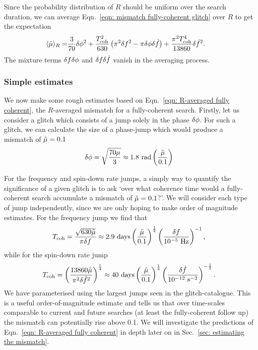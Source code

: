 \documentclass[../full_thesis/full_thesis.tex]{subfiles}
\begin{document}
Since the probability distribution of
$R$ should be uniform over the search duration, we can average Eqn.~\eqref{eqn:
mismatch fully-coherent glitch} over $R$ to get the expectation
\begin{align}
\langle \tilde{\mu} \rangle_{R} = &
\frac{3}{70}\delta\phi^{2}
+ \frac{T_{\mathrm{coh}}^{2}}{630}\left(\pi^{2}\delta f^{2}
- \pi\delta\phi\delta\dot{f}\right)
+ \frac{\pi^{2}T_{\mathrm{coh}}^{4}}{13860} \delta\dot{f}^{2}.
\label{eqn: R-averaged fully coherent}
\end{align}
The mixture terms $\delta f\delta\phi$ and
$\delta f\delta\dot{f}$ vanish in the averaging process.

\subsubsection{Simple estimates}

We now make some rough estimates based on Eqn.~\eqref{eqn: R-averaged
fully coherent}, the $R$-averaged mismatch for a fully-coherent search.
Firstly, let us consider a glitch which consists of a jump solely in the phase
$\delta\phi$. For such a glitch, we can calculate the size of a phase-jump
which would produce a mismatch of $\tilde{\mu}=0.1$
\begin{align}
\delta\phi =
\sqrt{\frac{70\mu}{3}} \approx 1.8 \textrm{ rad} \left(\frac{\tilde{\mu}}{0.1}\right)
\end{align}

For the frequency and spin-down rate jumps,
a simply way to quantify the significance of a given glitch is to ask `over
what coherence time would a fully-coherent search accumulate a mismatch of
$\tilde{\mu}=0.1$?'. We will consider each type of jump independently, since we are
only hoping to make order of magnitude estimates.
For the frequency jump we find that
\begin{align}
T_\textrm{coh} = \frac{\sqrt{630 \tilde{\mu}}}{\pi\delta f}
\approx 2.9 \textrm{ days} \left(\frac{\tilde{\mu}}{0.1}\right)^{\frac{1}{2}}
\left(\frac{\delta f}{10^{-5} \textrm{ Hz}}\right)^{-1},
\end{align}
while for the spin-down rate jump
\begin{align}
T_\textrm{coh} =
\left(\frac{13860 \tilde{\mu}}{\pi^{2}\delta\dot{f}^{2}}\right)^{\frac{1}{4}}
\approx 40 \textrm{ days} \left(\frac{\tilde{\mu}}{0.1}\right)^{\frac{1}{4}}
\left(\frac{\delta\dot{f}}{10^{-12} \textrm{ s}^{-2}}\right)^{-\frac{1}{2}}.
\end{align}
We have parameterised using the largest jumps seen in the
glitch-catalogue.  This is a useful order-of-magnitude estimate and tells us
that over time-scales comparable to current and future searches (at least the
fully-coherent follow up) the mismatch can potentially rise above 0.1.
We will investigate the predictions of Eqn.~\eqref{eqn: R-averaged fully coherent}
in depth later on in Sec.~\ref{sec: estimating the mismatch}.
\end{document}
